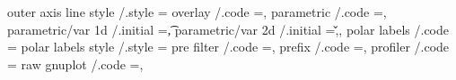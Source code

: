 {{{{{{{{{{{{{{{{{{{{{{{{{{{{{{{{{{{{{{outer axis line style                        /.style                                                                                   ={                                                                                                                  
overlay                                      /.code                                                                                    ={},       
parametric                                   /.code                                                                                    ={},%
parametric/var 1d                            /.initial                                                                                 =\t,                                                                                                                
parametric/var 2d                            /.initial                                                                                 ={\u,\v},                                                                                                           
polar labels                                 /.code                                                                                    ={                                                                                                                  
polar labels style                           /.style                                                                                   ={%
pre filter                                   /.code                                                                                    ={},                                                                                                                
prefix                                       /.code                                                                                    ={},       
profiler                                     /.code                                                                                    ={%
raw gnuplot                                  /.code                                                                                    ={},       
}}}}}}}}}}}}}}}}}}}}}}}}}}}}}}}}}}}}}}}}}}
